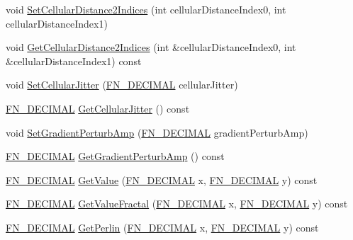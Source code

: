 \begin{DoxyCompactItemize}
\item 
void \mbox{\hyperlink{class_fast_noise_afcd4ef6ef500424eea447449bd1eac8b}{Set\+Cellular\+Distance2\+Indices}} (int cellular\+Distance\+Index0, int cellular\+Distance\+Index1)
\item 
void \mbox{\hyperlink{class_fast_noise_a7c56dd4b0fd724af5ea1e75f9f2e098c}{Get\+Cellular\+Distance2\+Indices}} (int \&cellular\+Distance\+Index0, int \&cellular\+Distance\+Index1) const
\item 
void \mbox{\hyperlink{class_fast_noise_a99ea21716db492c179b4d632594a430c}{Set\+Cellular\+Jitter}} (\mbox{\hyperlink{_fast_noise_8h_a75a9ef6d2541c4921815b885bfd449c3}{F\+N\+\_\+\+D\+E\+C\+I\+M\+AL}} cellular\+Jitter)
\item 
\mbox{\hyperlink{_fast_noise_8h_a75a9ef6d2541c4921815b885bfd449c3}{F\+N\+\_\+\+D\+E\+C\+I\+M\+AL}} \mbox{\hyperlink{class_fast_noise_a5b8e99dc20ff89a137b9b90611463ff3}{Get\+Cellular\+Jitter}} () const
\item 
void \mbox{\hyperlink{class_fast_noise_a3b64dacf76e2a0f61769d51c73e9fdb3}{Set\+Gradient\+Perturb\+Amp}} (\mbox{\hyperlink{_fast_noise_8h_a75a9ef6d2541c4921815b885bfd449c3}{F\+N\+\_\+\+D\+E\+C\+I\+M\+AL}} gradient\+Perturb\+Amp)
\item 
\mbox{\hyperlink{_fast_noise_8h_a75a9ef6d2541c4921815b885bfd449c3}{F\+N\+\_\+\+D\+E\+C\+I\+M\+AL}} \mbox{\hyperlink{class_fast_noise_a5a7d929f828f01ccf740de9198aaed3c}{Get\+Gradient\+Perturb\+Amp}} () const
\item 
\mbox{\hyperlink{_fast_noise_8h_a75a9ef6d2541c4921815b885bfd449c3}{F\+N\+\_\+\+D\+E\+C\+I\+M\+AL}} \mbox{\hyperlink{class_fast_noise_a14145aaff0f8502eb5fd0f168562c69c}{Get\+Value}} (\mbox{\hyperlink{_fast_noise_8h_a75a9ef6d2541c4921815b885bfd449c3}{F\+N\+\_\+\+D\+E\+C\+I\+M\+AL}} x, \mbox{\hyperlink{_fast_noise_8h_a75a9ef6d2541c4921815b885bfd449c3}{F\+N\+\_\+\+D\+E\+C\+I\+M\+AL}} y) const
\item 
\mbox{\hyperlink{_fast_noise_8h_a75a9ef6d2541c4921815b885bfd449c3}{F\+N\+\_\+\+D\+E\+C\+I\+M\+AL}} \mbox{\hyperlink{class_fast_noise_a637789887aa7727d701d9dbcb261a170}{Get\+Value\+Fractal}} (\mbox{\hyperlink{_fast_noise_8h_a75a9ef6d2541c4921815b885bfd449c3}{F\+N\+\_\+\+D\+E\+C\+I\+M\+AL}} x, \mbox{\hyperlink{_fast_noise_8h_a75a9ef6d2541c4921815b885bfd449c3}{F\+N\+\_\+\+D\+E\+C\+I\+M\+AL}} y) const
\item 
\mbox{\hyperlink{_fast_noise_8h_a75a9ef6d2541c4921815b885bfd449c3}{F\+N\+\_\+\+D\+E\+C\+I\+M\+AL}} \mbox{\hyperlink{class_fast_noise_aa511d58e188f47cf4fd7fa83164e7a0b}{Get\+Perlin}} (\mbox{\hyperlink{_fast_noise_8h_a75a9ef6d2541c4921815b885bfd449c3}{F\+N\+\_\+\+D\+E\+C\+I\+M\+AL}} x, \mbox{\hyperlink{_fast_noise_8h_a75a9ef6d2541c4921815b885bfd449c3}{F\+N\+\_\+\+D\+E\+C\+I\+M\+AL}} y) const

\end{DoxyCompactItemize}
